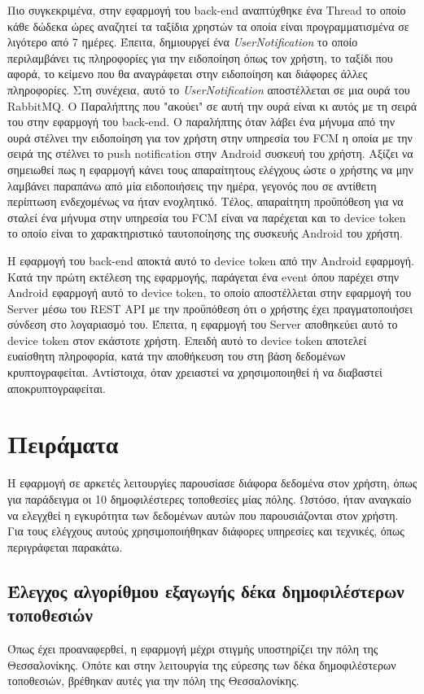 \documentclass[oneside, 12pt]{book}
\begin{document}
Πιο συγκεκριμένα, στην εφαρμογή του back-end αναπτύχθηκε ένα Thread 
το οποίο κάθε δώδεκα ώρες αναζητεί τα ταξίδια χρηστών τα οποία είναι 
προγραμματισμένα σε λιγότερο από 7 ημέρες. Έπειτα, δημιουργεί ένα 
\textit{UserNotification} το οποίο περιλαμβάνει τις πληροφορίες για 
την ειδοποίηση όπως τον χρήστη, το ταξίδι που αφορά, το κείμενο που 
θα αναγράφεται στην ειδοποίηση και διάφορες άλλες πληροφορίες. Στη 
συνέχεια, αυτό το \textit{UserNotification} αποστέλλεται σε μια ουρά 
του RabbitMQ. Ο Παραλήπτης που "ακούει" σε αυτή την ουρά είναι κι 
αυτός με τη σειρά του στην εφαρμογή του back-end. Ο παραλήπτης όταν 
λάβει ένα μήνυμα από την ουρά στέλνει την ειδοποίηση για τον χρήστη 
στην υπηρεσία του FCM η οποία με την σειρά της στέλνει το push 
notification στην Android συσκευή του χρήστη. Αξίζει να σημειωθεί πως 
η εφαρμογή κάνει τους απαραίτητους ελέγχους ώστε ο χρήστης να μην 
λαμβάνει παραπάνω από μία ειδοποιήσεις την ημέρα, γεγονός που σε 
αντίθετη περίπτωση ενδεχομένως να ήταν ενοχλητικό. Τέλος, απαραίτητη 
προϋπόθεση για να σταλεί ένα μήνυμα στην υπηρεσία του FCM είναι να 
παρέχεται και το device token το οποίο είναι το χαρακτηριστικό 
ταυτοποίησης της συσκευής Android του χρήστη. 

Η εφαρμογή του back-end αποκτά αυτό το device token από την Android 
εφαρμογή. Κατά την πρώτη εκτέλεση της εφαρμογής, παράγεται ένα event 
όπου παρέχει στην Android εφαρμογή αυτό το device token, το οποίο 
αποστέλλεται στην εφαρμογή του Server μέσω του REST API με την 
προϋπόθεση ότι ο χρήστης έχει πραγματοποιήσει σύνδεση στο λογαριασμό 
του. Έπειτα, η εφαρμογή του Server αποθηκεύει αυτό το device token 
στον εκάστοτε χρήστη.
Επειδή αυτό το device token αποτελεί ευαίσθητη πληροφορία, κατά την 
αποθήκευση του στη βάση δεδομένων κρυπτογραφείται. Αντίστοιχα, όταν 
χρειαστεί να χρησιμοποιηθεί ή να διαβαστεί αποκρυπτογραφείται.

\chapter{Πειράματα}
Η εφαρμογή σε αρκετές λειτουργίες παρουσίασε διάφορα δεδομένα στον 
χρήστη, όπως για παράδειγμα οι 10 δημοφιλέστερες τοποθεσίες μίας 
πόλης. Ωστόσο, ήταν αναγκαίο να ελεγχθεί η εγκυρότητα των δεδομένων 
αυτών που παρουσιάζονται στον χρήστη. Για τους ελέγχους αυτούς 
χρησιμοποιήθηκαν διάφορες υπηρεσίες και τεχνικές, όπως περιγράφεται παρακάτω.

\section{Έλεγχος αλγορίθμου εξαγωγής δέκα δημοφιλέστερων τοποθεσιών}
Όπως έχει προαναφερθεί, η εφαρμογή μέχρι στιγμής υποστηρίζει την πόλη 
της Θεσσαλονίκης. Οπότε και στην λειτουργία της εύρεσης των δέκα 
δημοφιλέστερων τοποθεσιών, βρέθηκαν αυτές για την πόλη της 
Θεσσαλονίκης.
\end{document}
